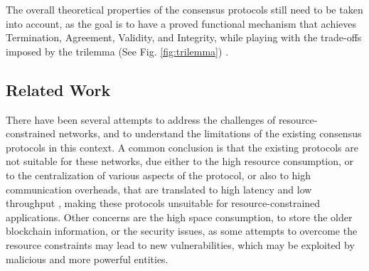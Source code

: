 \documentclass[journal]{IEEEtran}
\begin{document}
The overall theoretical properties of the consensus protocols still need to be taken into account,
as the goal is to have a proved functional mechanism that achieves Termination, Agreement, Validity, and Integrity,
while playing with the trade-offs imposed by the trilemma (See Fig. \ref{fig:trilemma}) \cite{survey-dist-consensus}.

\subsection{Related Work}

There have been several attempts to address the challenges of resource-constrained networks,
and to understand the limitations of the existing consensus protocols in this context.
A common conclusion is that the existing protocols are not suitable for these networks,
due either to the high resource consumption, or to the centralization of various aspects of the protocol,
or also to high communication overheads, that are translated to high latency and low throughput \cite{SALIMITARI2020100212},
making these protocols unsuitable for resource-constrained applications. Other concerns are
the high space consumption, to store the older blockchain information, or the security issues, 
as some attempts to overcome the resource constraints may lead to new vulnerabilities,
which may be exploited by malicious and more powerful entities.
\end{document}
